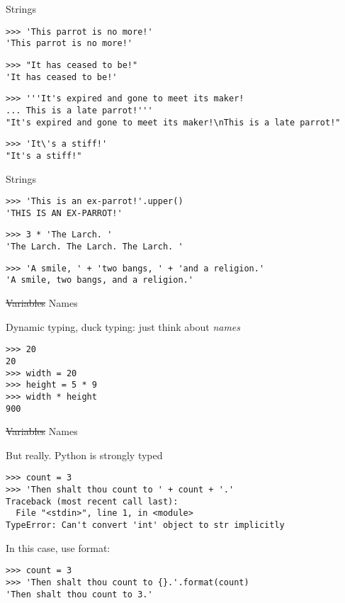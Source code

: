 \documentclass[ignorenonframetext,]{beamer}
\begin{document}
\begin{frame}[fragile]{Strings}
    \begin{verbatim}
>>> 'This parrot is no more!'
'This parrot is no more!'
    \end{verbatim}

    \pause
    \begin{verbatim}
>>> "It has ceased to be!"
'It has ceased to be!'
    \end{verbatim}

    \pause
    \begin{verbatim}
>>> '''It's expired and gone to meet its maker!
... This is a late parrot!'''
"It's expired and gone to meet its maker!\nThis is a late parrot!"
    \end{verbatim}

    \pause
    \begin{verbatim}
>>> 'It\'s a stiff!'
"It's a stiff!"
    \end{verbatim}
\end{frame}

\begin{frame}[fragile]{Strings}
    \begin{verbatim}
>>> 'This is an ex-parrot!'.upper()
'THIS IS AN EX-PARROT!'
    \end{verbatim}

    \pause
    \begin{verbatim}
>>> 3 * 'The Larch. '
'The Larch. The Larch. The Larch. '
    \end{verbatim}

    \pause
    \begin{verbatim}
>>> 'A smile, ' + 'two bangs, ' + 'and a religion.'
'A smile, two bangs, and a religion.'
    \end{verbatim}
\end{frame}

\begin{frame}[fragile]{\st{Variables} Names}

    Dynamic typing, duck typing: just think about \emph{names}

    \begin{verbatim}
>>> 20
20
>>> width = 20
>>> height = 5 * 9
>>> width * height
900
    \end{verbatim}
\end{frame}

\begin{frame}[fragile]{\st{Variables} Names}

    But really. Python is strongly typed

    \begin{verbatim}
>>> count = 3
>>> 'Then shalt thou count to ' + count + '.'
Traceback (most recent call last):
  File "<stdin>", line 1, in <module>
TypeError: Can't convert 'int' object to str implicitly
    \end{verbatim}

    \pause
    In this case, use format:
    \begin{verbatim}
>>> count = 3
>>> 'Then shalt thou count to {}.'.format(count)
'Then shalt thou count to 3.'
    \end{verbatim}
\end{frame}
\end{document}
